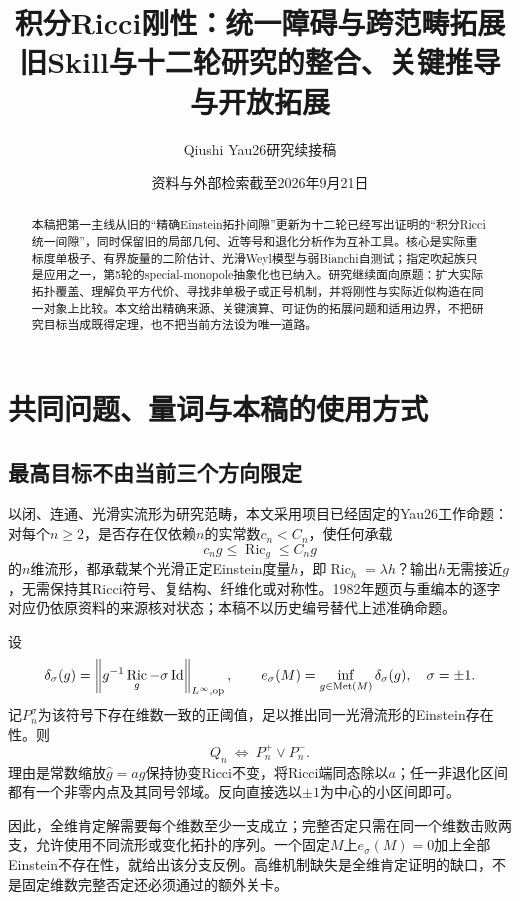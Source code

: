 \documentclass[UTF8,fontset=fandol,zihao=-4]{ctexart}
\title{积分Ricci刚性：统一障碍与跨范畴拓展\\[3mm]\large 旧Skill与十二轮研究的整合、关键推导与开放拓展}
\author{Qiushi Yau26研究续接稿}
\date{资料与外部检索截至2026年9月21日}
\DeclareMathOperator{\Ric}{Ric}\DeclareMathOperator{\Rm}{Rm}
\DeclareMathOperator{\Id}{Id}\DeclareMathOperator{\Hess}{Hess}
\newcommand{\norm}[1]{\left\|#1\right\|}
\theoremstyle{cn}
\begin{document}
\maketitle
\begin{abstract}

本稿把第一主线从旧的“精确Einstein拓扑间隙”更新为十二轮已经写出证明的“积分Ricci统一间隙”，同时保留旧的局部几何、近等号和退化分析作为互补工具。核心是实际重标度单极子、有界旋量的二阶估计、光滑Weyl模型与弱Bianchi自测试；指定吹起族只是应用之一，第5轮的special-monopole抽象化也已纳入。研究继续面向原题：扩大实际拓扑覆盖、理解负平方代价、寻找非单极子或正号机制，并将刚性与实际近似构造在同一对象上比较。本文给出精确来源、关键演算、可证伪的拓展问题和适用边界，不把研究目标当成既得定理，也不把当前方法设为唯一道路。

\end{abstract}\begingroup\small\setlength{\parskip}{0pt}\tableofcontents\endgroup\newpage

\section{共同问题、量词与本稿的使用方式}
\subsection{最高目标不由当前三个方向限定}
以闭、连通、光滑实流形为研究范畴，本文采用项目已经固定的Yau26工作命题：对每个$n\ge2$，是否存在仅依赖$n$的实常数$c_n<C_n$，使任何承载
\[
 c_ng\le\Ric_g\le C_ng
\]
的$n$维流形，都承载某个光滑正定Einstein度量$h$，即$\Ric_h=\lambda h$？输出$h$无需接近$g$，无需保持其Ricci符号、复结构、纤维化或对称性。1982年题页与重编本的逐字对应仍依原资料的来源核对状态；本稿不以历史编号替代上述准确命题。

设
\[
 \delta_\sigma(g)=\norm{g^{-1}\Ric_g-\sigma\Id}_{L^\infty,\op},\qquad
 e_\sigma(M)=\inf_{g\in\Met(M)}\delta_\sigma(g),\quad\sigma=\pm1.
\]
记$P_n^\sigma$为该符号下存在维数一致的正阈值，足以推出同一光滑流形的Einstein存在性。则
\begin{equation}\label{eq:Q}
 Q_n\ \Longleftrightarrow\ P_n^+\lor P_n^-.
\end{equation}
理由是常数缩放$\widehat g=ag$保持协变Ricci不变，将Ricci端同态除以$a$；任一非退化区间都有一个非零内点及其同号邻域。反向直接选以$\pm1$为中心的小区间即可。

因此，全维肯定解需要每个维数至少一支成立；完整否定只需在同一个维数击败两支，允许使用不同流形或变化拓扑的序列。一个固定$M$上$e_\sigma(M)=0$加上全部Einstein不存在性，就给出该分支反例。高维机制缺失是全维肯定证明的缺口，不是固定维数完整否定还必须通过的额外关卡。
\end{document}
